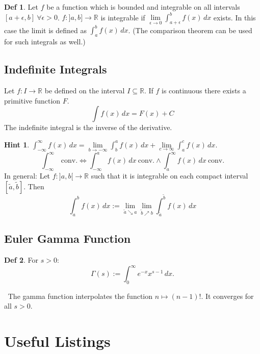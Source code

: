 \documentclass[a4paper, 10pt]{article}
\theoremstyle{definition}
\newtheorem*{definition}{Def}
\newtheorem*{note_wrapper}{Hint}
\theoremstyle{ex}
\theoremstyle{named}
\newenvironment{note}%
    {\begin{mdframed}[style=trick]\begin{note_wrapper}}%
    {\end{note_wrapper}\end{mdframed}}
\newcommand{\R}{\mathbb{R}}
\begin{document}
\begin{definition}
    Let $f$ be a function which is bounded and integrable on all intervals $[a + \epsilon, b] \ \forall \epsilon > 0$. $f: ]a, b] \to \R$ is integrable if $\lim\limits_{\epsilon \to 0} \int_{a + \epsilon}^b f(x) \,dx$ exists. In this case the limit is defined as $\int_a^b f(x) \,dx$. (The comparison theorem can be used for such integrals as well.)
\end{definition}

\subsection{Indefinite Integrals}
Let $f: I \to \R$ be defined on the interval $I \subseteq \R$. If $f$ is continuous there exists a primitive function $F$.
$$\int f(x) \,dx = F(x) + C$$
The indefinite integral is the inverse of the derivative.

\begin{note}
    $\int_{-\infty}^\infty f(x) \,dx = \lim\limits_{b \to - \infty} \int_b^a f(x) \,dx + \lim\limits_{c \to \infty} \int_a^c f(x) \,dx$.
    $$\int_{-\infty}^\infty \ \text{conv.} \iff \int_{-\infty}^a f(x) \,dx \ \text{conv.} \land \int_a^\infty f(x) \,dx \ \text{conv.}$$
    In general: Let $f: ]a, b[ \to \R$ such that it is integrable on each compact interval $[\tilde{a}, \tilde{b}]$. Then 
    $$\int_a^b f(x) \,dx := \lim\limits_{\tilde{a} \searrow a}\lim\limits_{\tilde{b} \nearrow b} \int_{\tilde{a}}^{\tilde{b}} f(x) \,dx$$
\end{note}

\subsection{Euler Gamma Function}
\begin{definition}
    For $s > 0$:
    $$\Gamma(s) := \int_0^\infty e^{-x}x^{s - 1} \,dx.$$
\end{definition}
$\ $ \newline The gamma function interpolates the function $n \mapsto (n-1)!$. It converges for all $s > 0$.
\pagebreak

\section*{Useful Listings}
\end{document}
